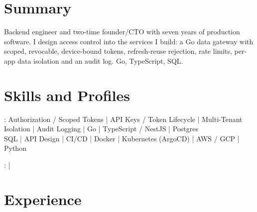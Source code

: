 \documentclass[print]{jack-resume}
\begin{document}
\pagecolor{darkmodeBackground}


\begin{minipage}[t][1cm][t]{.03\textwidth}
    \hfill
\end{minipage}

\section{Summary}
Backend engineer and two-time founder/CTO with seven years of production software. I design access control into the services I build: a Go data gateway with scoped, revocable, device-bound tokens, refresh-reuse rejection, rate limits, per-app data isolation and an audit log. Go, TypeScript, SQL.
\sectionsep

\section{Skills and Profiles}
:
Authorization / Scoped Tokens \hfill | \hfill
API Keys / Token Lifecycle \hfill | \hfill
Multi-Tenant Isolation \hfill | \hfill
Audit Logging \hfill | \hfill
Go \hfill | \hfill
TypeScript / NestJS \hfill | \hfill
Postgres \\
\hspace{1.0cm} SQL \hfill | \hfill
API Design \hfill | \hfill
CI/CD \hfill | \hfill
Docker \hfill | \hfill
Kubernetes (ArgoCD) \hfill | \hfill
AWS / GCP \hfill | \hfill
Python \\

\raggedright{
    :
      \href{https://www.linkedin.com/in/jack-sturtevant/}{ \ExternalLink} |
     \href{https://github.com/jacksturt}{ \ExternalLink}}

\section{Experience}
\end{document}
